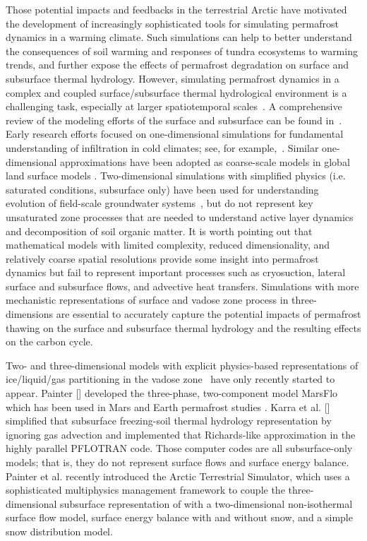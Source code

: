 \documentclass[review]{elsarticle}
\begin{document}
Those potential impacts and feedbacks in the terrestrial Arctic have motivated the development of increasingly sophisticated tools for simulating permafrost dynamics in a warming climate. Such simulations can help to better understand the consequences of soil warming and responses of tundra ecosystems to warming trends, and further expose the effects of permafrost degradation on surface and subsurface thermal hydrology. However, simulating permafrost dynamics in a complex and coupled surface/subsurface thermal hydrological environment is a challenging task, especially at larger spatiotemporal scales~\cite{painter2013modeling}.  A comprehensive review of the modeling efforts of the surface and subsurface can be found in~\cite{kurylyk2014climate}. Early research efforts focused on one-dimensional simulations for fundamental understanding of infiltration in cold climates; see, for example,~\cite{harlan1973analysis, guymon1974coupled, taylor1978model}. Similar one-dimensional approximations have been adopted as coarse-scale models in global land surface models \cite{takata2003development, nicolsky2007improved, lawrence2012simulation, koven2013analysis}.  Two-dimensional simulations with simplified physics (i.e. saturated conditions, subsurface only) have been used for understanding evolution of field-scale groundwater systems~\cite{mckenzie2007groundwater, bense2009evolution}, but do not represent key unsaturated zone processes that are needed to understand active layer dynamics and decomposition of soil organic matter.   It is worth pointing out that mathematical models with limited complexity, reduced dimensionality, and relatively coarse spatial resolutions provide some insight into permafrost dynamics but fail to represent important processes such as cryosuction, lateral surface and subsurface flows, and advective heat transfers. Simulations with more mechanistic representations of surface and vadose zone process in three-dimensions are essential to accurately capture the potential impacts of permafrost thawing on the surface and subsurface thermal hydrology and the resulting effects on the carbon cycle. 

Two- and three-dimensional models with explicit physics-based representations of ice/liquid/gas partitioning in the vadose zone~\cite{painter2014constitutive} have only recently started to appear. Painter [\citeyear{marsflo}] developed the three-phase, two-component model MarsFlo which has been used in Mars \cite{grimm2009mars} and Earth permafrost studies \cite{frampton2011}.  Karra et al. [\citeyear{karra2014three}] simplified that subsurface freezing-soil thermal hydrology representation by ignoring gas advection and implemented that Richards-like approximation in the highly parallel PFLOTRAN \cite{pflotran-web-page} code. Those computer codes are all subsurface-only models; that is, they do not represent surface flows and surface energy balance. Painter et al. \citeyear{spainter2016integrated} recently introduced the Arctic Terrestrial Simulator, which uses a sophisticated multiphysics management framework \cite{ecoon2016managing} to couple the three-dimensional subsurface representation of \cite{karra2014three} with a two-dimensional non-isothermal surface flow model, surface energy balance with and without snow, and a simple snow distribution model. 
\end{document}
